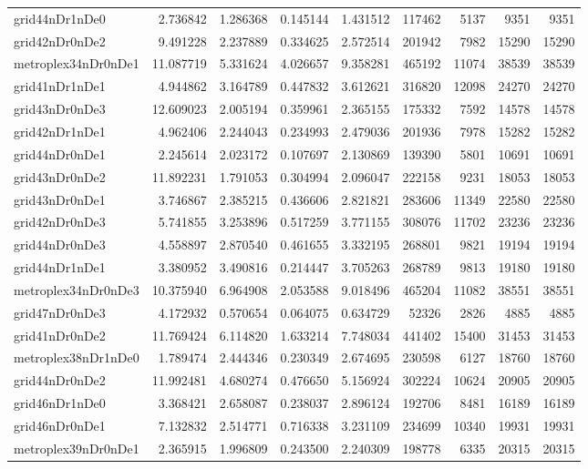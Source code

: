 \begin{longtable}{|l|r|r|r|r|r|r|r|r|}
grid44nDr1nDe0 & 2.736842 & 1.286368 & 0.145144 & 1.431512 & 117462 & 5137 & 9351 & 9351 \\
grid42nDr0nDe2 & 9.491228 & 2.237889 & 0.334625 & 2.572514 & 201942 & 7982 & 15290 & 15290 \\
metroplex34nDr0nDe1 & 11.087719 & 5.331624 & 4.026657 & 9.358281 & 465192 & 11074 & 38539 & 38539 \\
grid41nDr1nDe1 & 4.944862 & 3.164789 & 0.447832 & 3.612621 & 316820 & 12098 & 24270 & 24270 \\
grid43nDr0nDe3 & 12.609023 & 2.005194 & 0.359961 & 2.365155 & 175332 & 7592 & 14578 & 14578 \\
grid42nDr1nDe1 & 4.962406 & 2.244043 & 0.234993 & 2.479036 & 201936 & 7978 & 15282 & 15282 \\
grid44nDr0nDe1 & 2.245614 & 2.023172 & 0.107697 & 2.130869 & 139390 & 5801 & 10691 & 10691 \\
grid43nDr0nDe2 & 11.892231 & 1.791053 & 0.304994 & 2.096047 & 222158 & 9231 & 18053 & 18053 \\
grid43nDr0nDe1 & 3.746867 & 2.385215 & 0.436606 & 2.821821 & 283606 & 11349 & 22580 & 22580 \\
grid42nDr0nDe3 & 5.741855 & 3.253896 & 0.517259 & 3.771155 & 308076 & 11702 & 23236 & 23236 \\
grid44nDr0nDe3 & 4.558897 & 2.870540 & 0.461655 & 3.332195 & 268801 & 9821 & 19194 & 19194 \\
grid44nDr1nDe1 & 3.380952 & 3.490816 & 0.214447 & 3.705263 & 268789 & 9813 & 19180 & 19180 \\
metroplex34nDr0nDe3 & 10.375940 & 6.964908 & 2.053588 & 9.018496 & 465204 & 11082 & 38551 & 38551 \\
grid47nDr0nDe3 & 4.172932 & 0.570654 & 0.064075 & 0.634729 & 52326 & 2826 & 4885 & 4885 \\
grid41nDr0nDe2 & 11.769424 & 6.114820 & 1.633214 & 7.748034 & 441402 & 15400 & 31453 & 31453 \\
metroplex38nDr1nDe0 & 1.789474 & 2.444346 & 0.230349 & 2.674695 & 230598 & 6127 & 18760 & 18760 \\
grid44nDr0nDe2 & 11.992481 & 4.680274 & 0.476650 & 5.156924 & 302224 & 10624 & 20905 & 20905 \\
grid46nDr1nDe0 & 3.368421 & 2.658087 & 0.238037 & 2.896124 & 192706 & 8481 & 16189 & 16189 \\
grid46nDr0nDe1 & 7.132832 & 2.514771 & 0.716338 & 3.231109 & 234699 & 10340 & 19931 & 19931 \\
metroplex39nDr0nDe1 & 2.365915 & 1.996809 & 0.243500 & 2.240309 & 198778 & 6335 & 20315 & 20315 \\

\end{longtable}
